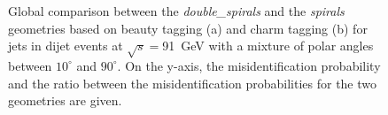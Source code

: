 \begin{figure}[H]
\begin{subfigure}[b]{0.5\textwidth}
    \caption{}
    \label{}
  \end{subfigure}
  \caption{Global comparison between the \textit{double\_spirals} and the
    \textit{spirals} geometries based on beauty tagging (a) and charm
    tagging (b) for jets in dijet events at $\sqrt{s}=$91~GeV with a
    mixture of polar angles between $10^{\circ}$ and $90^{\circ}$. On the y-axis, the misidentification probability and the ratio between the misidentification probabilities for the two geometries are given.}\label{fig:globalComparison_double_spirals_91}
\end{figure}


